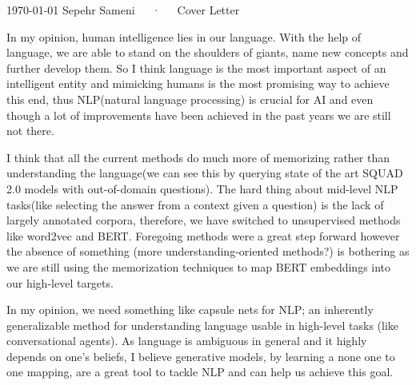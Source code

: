 \documentclass[11pt, a4paper]{awesome-cv}
\begin{document}
\makecvheader[R]

\makecvfooter
  {\today}
  {Sepehr Sameni~~~·~~~Cover Letter}
  {}

\makelettertitle

\begin{cvletter}

In my opinion, human intelligence lies in our language. With the help of language, we are able to stand on the shoulders of giants, name new concepts and further develop them. So I think language is the most important aspect of an intelligent entity and mimicking humans is the most promising way to achieve this end, thus NLP(natural language processing) is crucial for AI and even though a lot of improvements have been achieved in the past years we are still not there.

I think that all the current methods do much more of memorizing rather than understanding the language(we can see this by querying state of the art SQUAD 2.0 models with out-of-domain questions). The hard thing about mid-level NLP tasks(like selecting the answer from a context given a question) is the lack of largely annotated corpora, therefore, we have switched to unsupervised methods like word2vec and BERT. Foregoing methods were a great step forward however the absence of something (more understanding-oriented methods?) is bothering as we are still using the memorization techniques to map BERT embeddings into our high-level targets.

In my opinion, we need something like capsule nets for NLP; an inherently generalizable method for understanding language usable in high-level tasks (like conversational agents). As language is ambiguous in general and it highly depends on one's beliefs, I believe generative models, by learning a none one to one mapping, are a great tool to tackle NLP and can help us achieve this goal.


\end{cvletter}
\end{document}
